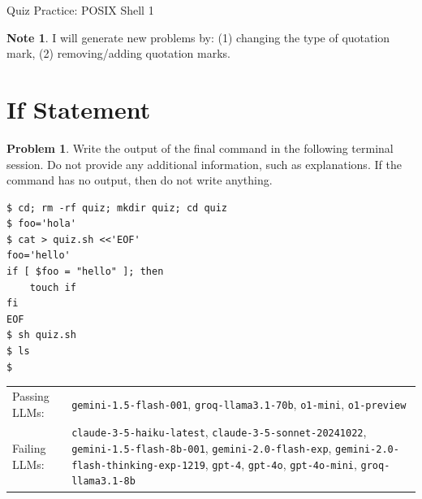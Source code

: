 \documentclass[10pt]{article}
\theoremstyle{definition}
\newtheorem{problem}{Problem}
\newtheorem{note}{Note}
\begin{document}
\begin{center}
{
\Large
Quiz Practice: POSIX Shell 1
}
\vspace{0.1in}
\end{center}

\begin{note}
    I will generate new problems by:
    (1) changing the type of quotation mark,
    (2) removing/adding quotation marks.
\end{note}

\noindent\vspace{0.1in}\begin{minipage}{\textwidth}
\section{If Statement}

\begin{problem}
Write the output of the final command in the following terminal session.
Do not provide any additional information,
such as explanations.
If the command has no output,
then do not write anything.

\end{problem}
\begin{lstlisting}
$ cd; rm -rf quiz; mkdir quiz; cd quiz
$ foo='hola'
$ cat > quiz.sh <<'EOF'
foo='hello'
if [ $foo = "hello" ]; then
    touch if
fi
EOF
$ sh quiz.sh
$ ls
$ 
\end{lstlisting}


\noindent
\begin{tabular}{p{1.0in}L{5in}}
Passing LLMs: & {\lstinline$gemini-1.5-flash-001$}, {\lstinline$groq-llama3.1-70b$}, {\lstinline$o1-mini$}, {\lstinline$o1-preview$} \\
Failing LLMs: & {\lstinline$claude-3-5-haiku-latest$}, {\lstinline$claude-3-5-sonnet-20241022$}, {\lstinline$gemini-1.5-flash-8b-001$}, {\lstinline$gemini-2.0-flash-exp$}, {\lstinline$gemini-2.0-flash-thinking-exp-1219$}, {\lstinline$gpt-4$}, {\lstinline$gpt-4o$}, {\lstinline$gpt-4o-mini$}, {\lstinline$groq-llama3.1-8b$} \\
\end{tabular}

\end{minipage}
\end{document}
